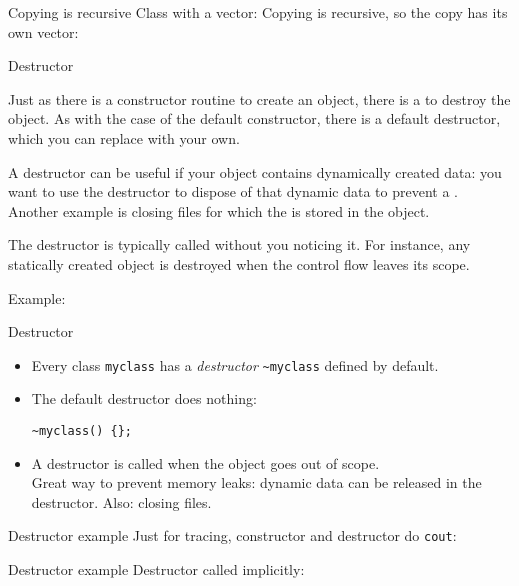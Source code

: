 \begin{block}{Copying is recursive}
  \label{sl:class-copy-vector}
  Class with a vector:
  Copying is recursive, so the copy has its own vector:
\end{block}

 {Destructor}
\label{sec:destructor}

Just as there is a constructor routine to create an object, there is a
 to destroy the object.
As with the case of the default constructor, there is a default
destructor, which you can replace with your own.

A destructor can be useful if your object contains dynamically created
data: you want to use the destructor to dispose of that dynamic data
to prevent a . Another example is closing
files for which the  is stored in the object.

The destructor is typically called without you noticing it. For
instance, any statically created object is destroyed when the control
flow leaves its scope.

Example:
%

\begin{slide}{Destructor}
  \label{sl:class-destruct}
  \begin{itemize}
  \item Every class \lstinline{myclass} has a \emph{destructor} \lstinline{~myclass}
    defined by default.
  \item The default destructor does nothing:
\begin{lstlisting}
~myclass() {};
\end{lstlisting}
\item A destructor is called when the object goes out of scope.\\
  Great way to prevent memory leaks: dynamic data can be released
  in the destructor. Also: closing files.
\end{itemize}
\end{slide}

\begin{slide}{Destructor example}
  \label{sl:class-destruct-ex1}
  Just for tracing, constructor and destructor do \lstinline{cout}:
\end{slide}

\begin{slide}{Destructor example}
  \label{sl:class-destruct-ex2}
  Destructor called implicitly:
\end{slide}

